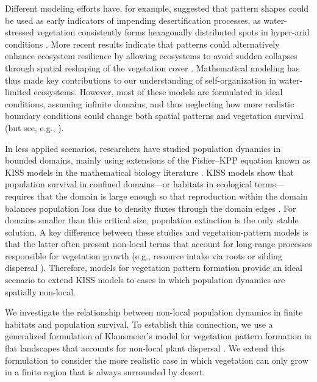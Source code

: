 \documentclass[review,onefignum,onetabnum]{SIAM-styles/siamart171218}
\begin{document}
Different modeling efforts have, for example, suggested that pattern shapes could be used as early indicators of impending desertification processes, as water-stressed vegetation consistently forms hexagonally distributed spots in hyper-arid conditions \cite{Lefever1997,VonHardenberg2001,Meron2004,Rietkerk2002}. More recent results indicate that patterns could alternatively enhance ecosystem resilience by allowing ecosystems to avoid sudden collapses through spatial reshaping of the vegetation cover \cite{Rietkerk2021}. Mathematical modeling has thus made key contributions to our understanding of self-organization in water-limited ecosystems. However, most of these models are formulated in ideal conditions, assuming infinite domains, and thus neglecting how more realistic boundary conditions could change both spatial patterns and vegetation survival (but see, e.g., \cite{Clerc2021,PintoRamos2023,PintoRamos2025}).

In less applied scenarios, researchers have studied population dynamics in bounded domains, mainly using extensions of the Fisher–KPP equation \cite{Cantrell1999,Fagan2009,Colombo2018,Dornelas2024} known as KISS models in the mathematical biology literature \cite{Skellam1951,Kierstead1953}. KISS models show that population survival in confined domains---or habitats in ecological terms---requires that the domain is large enough so that reproduction within the domain balances population loss due to density fluxes through the domain edges \cite{Cantrell2004}. For domains smaller than this critical size, population extinction is the only stable solution. A key difference between these studies and vegetation-pattern models is that the latter often present non-local terms that account for long-range processes responsible for vegetation growth (e.g., resource intake via roots or sibling dispersal \cite{Martinez-Garcia2014,Eigentler2018}). Therefore, models for vegetation pattern formation provide an ideal scenario to extend KISS models to cases in which population dynamics are spatially non-local. 

We investigate the relationship between non-local population dynamics in finite habitats and population survival. To establish this connection, we use a generalized formulation of Klausmeier's model for vegetation pattern formation in flat landscapes that accounts for non-local plant dispersal \cite{Eigentler2018,Klausmeier1999}. We extend this formulation to consider the more realistic case in which vegetation can only grow in a finite region that is always surrounded by desert. 
\end{document}
